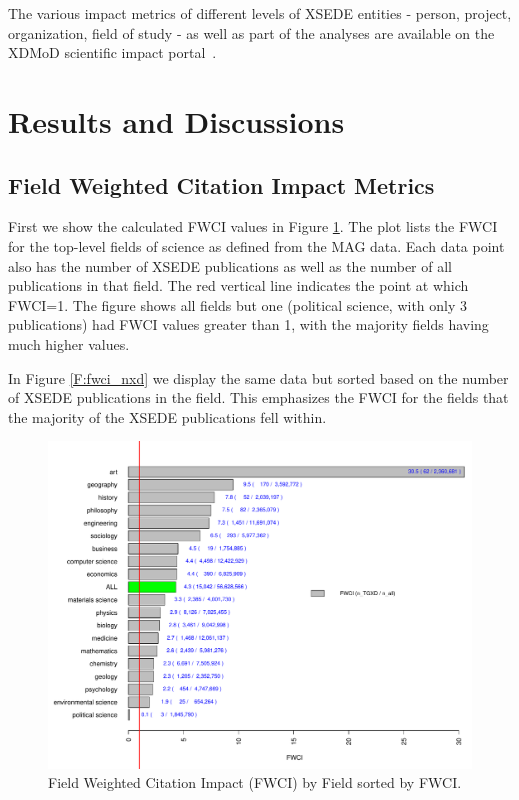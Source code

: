 \documentclass{sig-alternate}
\begin{document}
The various impact metrics of different levels of XSEDE entities -
person, project, organization, field of study - as well as part of the
analyses are available on the XDMoD scientific impact
portal~\cite{www-xdmod-sciimp}.

\section{Results and Discussions} \label{S:result}

\subsection{Field Weighted Citation Impact Metrics}

First we show the calculated FWCI values in Figure
\ref{F:fwci_fwci}. The plot lists the FWCI for the top-level fields of
science as defined from the MAG data.  Each data point also has the
number of XSEDE publications as well as the number of all publications
in that field. The red vertical line indicates the point at which
FWCI=1. The figure shows all fields but one (political science, with
only 3 publications) had FWCI values greater than 1, with the
majority fields having much higher values.

In Figure \ref{F:fwci_nxd} we display the same data but sorted based
on the number of XSEDE publications in the field. This emphasizes the
FWCI for the fields that the majority of the XSEDE publications fell
within.

\begin{figure}[htb!]
    \includegraphics[width=0.95\columnwidth]{images/fwci_fwci.pdf}
    \caption{Field Weighted Citation Impact (FWCI) by Field sorted by FWCI.}
    \label{F:fwci_fwci}
\end{figure}
\end{document}
